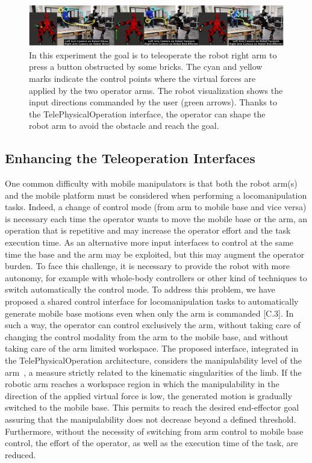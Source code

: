 \begin{figure}
	\centering
	\includegraphics[width=0.98\linewidth]{img/tpoExp}
	\caption{In this experiment the goal is to teleoperate the robot right arm to press a button obstructed by some bricks. The cyan and yellow marks indicate the control points where the virtual forces are applied by the two operator arms. The robot visualization shows the input directions commanded by the user (green arrows). Thanks to the TelePhysicalOperation interface, the operator can shape the robot arm to avoid the obstacle and reach the goal.}
	\label{fig:tpoexp}
\end{figure}


\subsection{Enhancing the Teleoperation Interfaces}
One common difficulty with mobile manipulators is that both the robot arm(s) and the mobile platform must be considered when performing a locomanipulation tasks. Indeed, a change of control mode (from arm to mobile base and vice versa) is necessary each time the operator wants to move the mobile base or the arm, an operation that is repetitive and may increase the operator effort and the task execution time. As an alternative more input interfaces to control at the same time the base and the arm may be exploited, but this may augment the operator burden. To face this challenge, it is necessary to provide the robot with more autonomy, for example with whole-body controllers or other kind of techniques to switch automatically the control mode.
To address this problem, we have proposed a shared control interface for locomanipulation tasks to automatically generate mobile base motions even when only the arm is commanded [C.3]. In such a way, the operator can control exclusively the arm, without taking care of changing the control modality from the arm to the mobile base, and without taking care of the arm limited workspace. The proposed interface, integrated in the TelePhysicalOperation architecture, considers the manipulability level of the arm~\cite{Yoshi1985}, a measure strictly related to the kinematic singularities of the limb. If the robotic arm reaches a workspace region in which the manipulability in the direction of the applied virtual force is low, the generated motion is gradually switched to the mobile base. This permits to reach the desired end-effector goal assuring that the manipulability does not decrease beyond a defined threshold. Furthermore, without the necessity of switching from arm control to mobile base control, the effort of the operator, as well as the execution time of the task, are reduced. 

